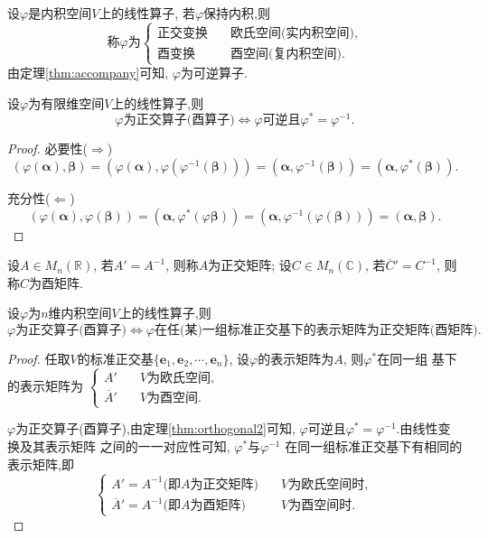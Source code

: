 \begin{definition}
  设$\varphi$是内积空间$V$上的线性算子,
  若$\varphi$保持内积,则
  \[
    \text{称$\varphi$为}
    \begin{cases}
      \text{正交变换}\quad & \text{欧氏空间(实内积空间)},\\
      \text{酉变换}\quad & \text{酉空间(复内积空间)}.
    \end{cases}
  \]
  由定理\ref{thm:accompany}可知,
  $\varphi$为可逆算子.
\end{definition}

\begin{theorem}\label{thm:orthogonal2}
  设$\varphi$为有限维空间$V$上的线性算子,则
  \[
    \varphi\text{为正交算子(酉算子)} \Longleftrightarrow
    \varphi\text{可逆且}\varphi^*= \varphi^{-1}.
  \]
\end{theorem}

\begin{proof}
  必要性($\Rightarrow$)
  \[
    (\varphi(\bm{\alpha}),\bm{\beta}) =
    (\varphi(\bm{\alpha}),\varphi(\varphi^{-1}(\bm{\beta}))) =
    (\bm{\alpha},\varphi^{-1}(\bm{\beta})) =
    (\bm{\alpha},\varphi^*(\bm{\beta})).
  \]

  充分性($\Leftarrow$)
  \[
    (\varphi(\bm{\alpha}),\varphi(\bm{\beta})) =
    (\bm{\alpha},\varphi^*(\varphi{\bm{\beta}})) =
    (\bm{\alpha},\varphi^{-1}(\varphi(\bm{\beta}))) =
    (\bm{\alpha},\bm{\beta}).
  \]
\end{proof}

\begin{definition}
  设$A\in M_n(\mathbb{R})$, 若$A'=A^{-1}$,
  则称$A$为正交矩阵;
  设$C\in M_n(\mathbb{C})$, 若$\overline{C}'=C^{-1}$,
  则称$C$为酉矩阵.
\end{definition}

\begin{theorem}
  设$\varphi$为$n$维内积空间$V$上的线性算子,则
  \[
    \varphi\text{为正交算子(酉算子)} \Longleftrightarrow
    \varphi\text{在任(某)一组标准正交基下的表示矩阵为正交矩阵(酉矩阵)}.
  \]
\end{theorem}

\begin{proof}
  任取$V$的标准正交基$\{\bm{e}_1, \bm{e}_2, \cdots, \bm{e}_n\}$,
  设$\varphi$的表示矩阵为$A$, 则$\varphi^*$在同一组
  基下的表示矩阵为
  $\begin{cases} A' \quad & V\text{为欧氏空间},\\
    \overline{A}' \quad & V\text{为酉空间}. \end{cases}$

  $\varphi$为正交算子(酉算子),由定理\ref{thm:orthogonal2}可知,
  $\varphi$可逆且$\varphi^*=\varphi^{-1}$.由线性变换及其表示矩阵
  之间的一一对应性可知, $\varphi^*$与$\varphi^{-1}$
  在同一组标准正交基下有相同的表示矩阵,即
  \[\begin{cases}
    A' = A^{-1} \text{(即$A$为正交矩阵)}\quad & V\text{为欧氏空间时},\\
    \overline{A}' = A^{-1} \text{(即$A$为酉矩阵)} \quad & V\text{为酉空间时}.
  \end{cases}\]
\end{proof}


